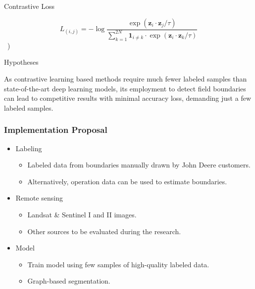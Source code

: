 \documentclass[xcolor=table]{beamer}
\begin{document}
\begin{frame}{Contrastive Loss}
	
	\centering
	
	\begin{equation}
	L_{(i,j)}=-\log{\frac{\exp{\left(\boldsymbol{z}_i\cdot\boldsymbol{z}_j/\tau\right)}}{\sum_{k=1}^{2N}\mathbf{1}_{i\neq k}\cdot\exp{\left(\boldsymbol{z}_i\cdot\boldsymbol{z}_k/\tau\right)}}}
	\end{equation}
	~\flushright \tiny \cite{chen2020})
\end{frame}

\begin{frame}{Hypotheses}

	\begin{tcolorbox}[colback=blue!5,colframe=blue!75!black]
		As contrastive learning based methods require much fewer labeled samples than state-of-the-art deep learning models, its employment to detect field boundaries can lead to competitive results with minimal accuracy loss, demanding just a few labeled samples.
	\end{tcolorbox}
		
\end{frame}

\begin{frame}\frametitle{Implementation Proposal} 
	
	\begin{itemize}
		
		\item Labeling
		\begin{itemize}
			\item Labeled data from boundaries manually drawn by John Deere customers.
			\item Alternatively, operation data can be used to estimate boundaries.
		\end{itemize}
        
        \item Remote sensing
		\begin{itemize}
			\item Landsat \& Sentinel I and II images.
			\item Other sources to be evaluated during the research.
		\end{itemize}
		
		\item Model
		\begin{itemize}
			\item Train model using few samples of high-quality labeled data.
			\item Graph-based segmentation.
		\end{itemize}
	\end{itemize}
	
\end{frame}
\end{document}

